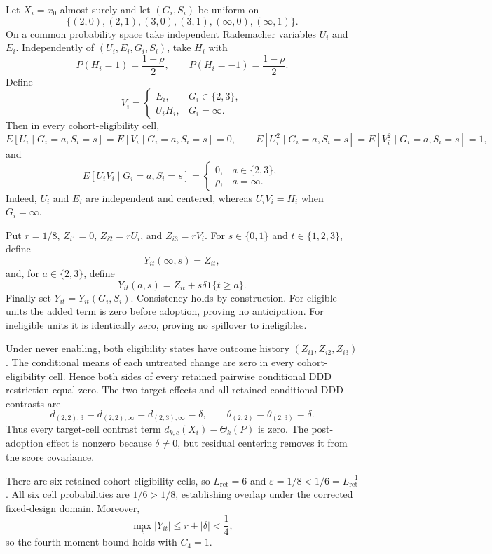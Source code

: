 Let \(X_i=x_0\) almost surely and let \((G_i,S_i)\) be uniform on
\[
 \{(2,0),(2,1),(3,0),(3,1),(\infty,0),(\infty,1)\}.
\]
On a common probability space take independent Rademacher variables \(U_i\) and \(E_i\). Independently of \((U_i,E_i,G_i,S_i)\), take \(H_i\) with
\[
 P(H_i=1)=\frac{1+\rho}{2},
 \qquad
 P(H_i=-1)=\frac{1-\rho}{2}.
\]
Define
\[
 V_i=
 \begin{cases}
 E_i,&G_i\in\{2,3\},\\
 U_iH_i,&G_i=\infty.
 \end{cases}
\]
Then in every cohort-eligibility cell,
\[
 E[U_i\mid G_i=a,S_i=s]=E[V_i\mid G_i=a,S_i=s]=0,
 \qquad
 E[U_i^2\mid G_i=a,S_i=s]=E[V_i^2\mid G_i=a,S_i=s]=1,
\]
and
\[
 E[U_iV_i\mid G_i=a,S_i=s]
 =\begin{cases}
 0,&a\in\{2,3\},\\
 \rho,&a=\infty.
 \end{cases}
\]
Indeed, \(U_i\) and \(E_i\) are independent and centered, whereas \(U_iV_i=H_i\) when \(G_i=\infty\).

Put \(r=1/8\), \(Z_{i1}=0\), \(Z_{i2}=rU_i\), and \(Z_{i3}=rV_i\). For \(s\in\{0,1\}\) and \(t\in\{1,2,3\}\), define
\[
 Y_{it}(\infty,s)=Z_{it},
\]
and, for \(a\in\{2,3\}\), define
\[
 Y_{it}(a,s)=Z_{it}+s\delta\mathbf 1\{t\ge a\}.
\]
Finally set \(Y_{it}=Y_{it}(G_i,S_i)\). Consistency holds by construction. For eligible units the added term is zero before adoption, proving no anticipation. For ineligible units it is identically zero, proving no spillover to ineligibles.

Under never enabling, both eligibility states have outcome history \((Z_{i1},Z_{i2},Z_{i3})\). The conditional means of each untreated change are zero in every cohort-eligibility cell. Hence both sides of every retained pairwise conditional DDD restriction equal zero. The two target effects and all retained conditional DDD contrasts are
\[
 d_{(2,2),3}=d_{(2,2),\infty}
 =d_{(2,3),\infty}=\delta,
 \qquad
 \theta_{(2,2)}=\theta_{(2,3)}=\delta.
\]
Thus every target-cell contrast term \(d_{k,c}(X_i)-\Theta_k(P)\) is zero. The post-adoption effect is nonzero because \(\delta\ne0\), but residual centering removes it from the score covariance.

There are six retained cohort-eligibility cells, so \(L_{\mathrm{ret}}=6\) and \(\varepsilon=1/8<1/6=L_{\mathrm{ret}}^{-1}\). All six cell probabilities are \(1/6>1/8\), establishing overlap under the corrected fixed-design domain. Moreover,
\[
 \max_t|Y_{it}|\le r+|\delta|<\frac14,
\]
so the fourth-moment bound holds with \(C_4=1\).

